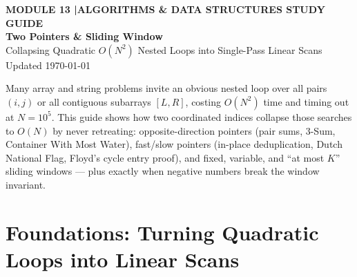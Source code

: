 \documentclass[11pt,a4paper]{article}
\newcommand{\sectionbreak}{}
\theoremstyle{definition}
\begin{document}
\thispagestyle{plain}
\begin{tcolorbox}[
    enhanced,
    colback=primaryblue!6, colframe=primaryblue!20,
    borderline west={5pt}{0pt}{primaryblue},
    arc=4pt, boxrule=0.6pt,
    left=14pt, right=14pt, top=7pt, bottom=7pt,
    before skip=0pt, after skip=5pt
]
    {\footnotesize\bfseries\color{accentteal}MODULE 13 \quad|\quad ALGORITHMS \& DATA STRUCTURES STUDY GUIDE}\\[3pt]
    {\Huge\bfseries\color{primaryblue}Two Pointers \& Sliding Window}\\[3pt]
    {\large\color{codegray}Collapsing Quadratic $O(N^2)$ Nested Loops into Single-Pass Linear Scans}\\[4pt]
    {\footnotesize\color{codegray}Updated \today}
\end{tcolorbox}

\begin{overviewbox}
{\small Many array and string problems invite an obvious nested loop over all pairs $(i, j)$ or all contiguous subarrays $[L, R]$, costing $O(N^2)$ time and timing out at $N = 10^5$. This guide shows how two coordinated indices collapse those searches to $O(N)$ by never retreating: opposite-direction pointers (pair sums, 3-Sum, Container With Most Water), fast/slow pointers (in-place deduplication, Dutch National Flag, Floyd's cycle entry proof), and fixed, variable, and ``at most $K$'' sliding windows --- plus exactly when negative numbers break the window invariant.}
\end{overviewbox}

\vspace{-6pt}
{\setlength{\parskip}{0pt}\footnotesize
\titlespacing*{\section}{0pt}{2pt}{6pt}%
\makeatletter
\let\lm@orig@addvspace\addvspace
\renewcommand{\addvspace}[1]{\lm@orig@addvspace{0.18em plus 1pt}}
\makeatother
\tableofcontents}

\renewcommand{\sectionbreak}{\clearpage}

\section{Foundations: Turning Quadratic Loops into Linear Scans}
\end{document}
